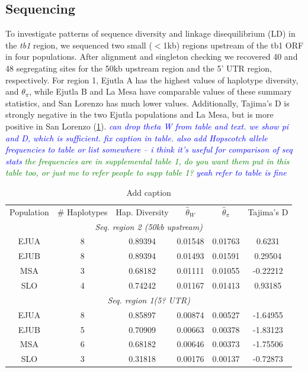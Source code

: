\documentclass[11pt]{article}
\newcommand{\jri}[1]{\textcolor{blue}{ \emph{\scriptsize  #1}} }
\newcommand{\lev}[1]{\textcolor{green}{\emph{\scriptsize #1}} }
\begin{document}
\begin{linenumbers}
\begin{flushleft}
\subsection*{Sequencing}

To investigate patterns of sequence diversity and linkage disequilibrium (LD) in the \emph{tb1} region, we sequenced two small ($<$1kb) regions upstream of the tb1 ORF in four populations. After alignment and singleton checking we recovered 40 and 48 segregating sites for the 50kb upstream region and the 5' UTR region, respectively. For region 1, Ejutla A has the highest values of haplotype diversity, and $\theta_\pi$, while Ejutla B and La Mesa have comparable values of these summary statistics, and San Lorenzo has much lower values. Additionally, Tajima's D is strongly negative in the two Ejutla populations and La Mesa, but is more positive in San Lorenzo (\ref{Table2Diversity}). \jri{can drop theta W from table and text. we show pi and D, which is sufficient. fix caption in table. also add \emph{Hopscotch} allele frequencies to table or list somewhere -- i think it's useful for comparison of seq stats } \lev{the frequencies are in supplemental table 1, do you want them put in this table too, or just me to refer people to supp table 1?} \jri{yeah refer to table is fine}
\begin{table}[htbp]
  \centering
  \caption{Add caption}
    \begin{tabular}{lccccc}
    Population & \# Haplotypes & Hap. Diversity & $\hat\theta_W$    & $\hat\theta_\pi$    & Tajima's D \\
    \multicolumn{6}{c}{\textit{Seq. region 2 (50kb upstream)}} \\
    \multicolumn{1}{c}{EJUA} & 8     & 0.89394 & 0.01548 & 0.01763 & 0.6231 \\
    \multicolumn{1}{c}{EJUB} & 8     & 0.89394 & 0.01493 & 0.01591 & 0.29504 \\
    \multicolumn{1}{c}{MSA} & 3     & 0.68182 & 0.01111 & 0.01055 & -0.22212 \\
    \multicolumn{1}{c}{SLO} & 4     & 0.74242 & 0.01167 & 0.01413 & 0.93185 \\
    \multicolumn{6}{c}{\textit{Seq.  region 1(5? UTR)}} \\
    \multicolumn{1}{c}{EJUA} & 8     & 0.85897 & 0.00874 & 0.00527 & -1.64955 \\
    \multicolumn{1}{c}{EJUB} & 5     & 0.70909 & 0.00663 & 0.00378 & -1.83123 \\
    \multicolumn{1}{c}{MSA} & 6     & 0.68182 & 0.00646 & 0.00373 & -1.75506 \\
    \multicolumn{1}{c}{SLO} & 3     & 0.31818 & 0.00176 & 0.00137 & -0.72873 \\
    \end{tabular}
  \label{Table2Diversity}
\end{table}


\end{flushleft}
\end{linenumbers}
\end{document}
